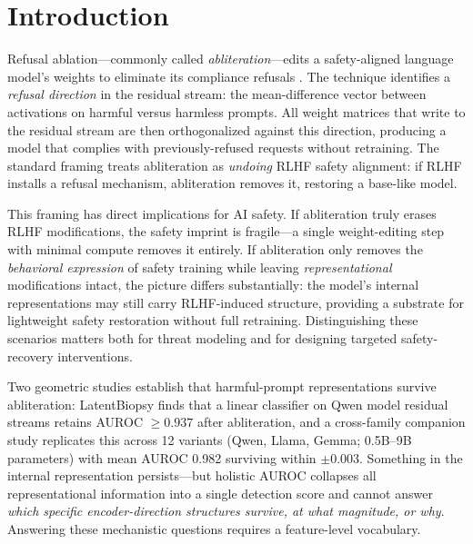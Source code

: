 \documentclass[11pt,letterpaper]{article}
\begin{document}
\section{Introduction}

Refusal ablation---commonly called \emph{abliteration}---edits a safety-aligned language model's
weights to eliminate its compliance refusals \citep{Arditi2024}. The technique identifies a
\emph{refusal direction} in the residual stream: the mean-difference vector between activations on
harmful versus harmless prompts. All weight matrices that write to the residual stream are then
orthogonalized against this direction, producing a model that complies with previously-refused
requests without retraining. The standard framing treats abliteration as \emph{undoing} RLHF safety
alignment: if RLHF installs a refusal mechanism, abliteration removes it, restoring a base-like model.

This framing has direct implications for AI safety. If abliteration truly erases RLHF modifications,
the safety imprint is fragile---a single weight-editing step with minimal compute removes it entirely.
If abliteration only removes the \emph{behavioral expression} of safety training while leaving
\emph{representational} modifications intact, the picture differs substantially: the model's internal
representations may still carry RLHF-induced structure, providing a substrate for lightweight safety
restoration without full retraining. Distinguishing these scenarios matters both for threat modeling
and for designing targeted safety-recovery interventions.

Two geometric studies establish that harmful-prompt representations survive abliteration: LatentBiopsy
\citep{LlorenteSaguer2026a} finds that a linear classifier on Qwen model residual streams retains
AUROC $\geq 0.937$ after abliteration, and a cross-family companion study \citep{LlorenteSaguer2026b}
replicates this across 12 variants (Qwen, Llama, Gemma; 0.5B--9B parameters) with mean AUROC 0.982
surviving within $\pm 0.003$. Something in the internal representation persists---but holistic AUROC
collapses all representational information into a single detection score and cannot answer \emph{which
specific encoder-direction structures survive, at what magnitude, or why}. Answering these mechanistic
questions requires a feature-level vocabulary.
\end{document}
